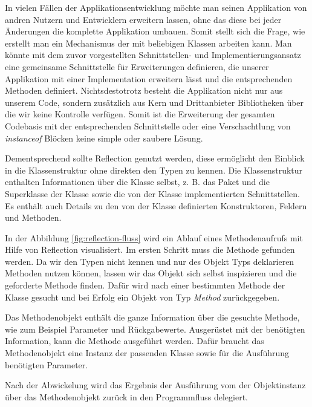   In vielen Fällen der Applikationsentwicklung möchte man seinen Applikation von andren Nutzern und Entwicklern erweitern lassen, ohne das diese bei jeder Änderungen die komplette Applikation umbauen. Somit stellt sich die Frage, wie erstellt man ein Mechanismus der mit beliebigen Klassen arbeiten kann. Man könnte mit dem zuvor vorgestellten Schnittstellen- und Implementierungsansatz eine gemeinsame Schnittstelle für Erweiterungen definieren, die unserer Applikation mit einer Implementation erweitern lässt und die entsprechenden Methoden definiert. Nichtsdestotrotz besteht die Applikation nicht nur aus unserem Code, sondern zusätzlich aus Kern und Drittanbieter Bibliotheken über die wir keine Kontrolle verfügen. Somit ist die Erweiterung der gesamten Codebasis mit der entsprechenden Schnittstelle oder eine Verschachtlung von \textit{instanceof} Blöcken keine simple oder saubere Lösung. 

  Dementsprechend sollte Reflection genutzt werden, diese ermöglicht den Einblick in die Klassenstruktur ohne direkten den Typen zu kennen. Die Klassenstruktur enthalten Informationen über die Klasse selbst, z. B. das Paket und die Superklasse der Klasse sowie die von der Klasse implementierten Schnittstellen. Es enthält auch Details zu den von der Klasse definierten Konstruktoren, Feldern und Methoden.\bigbreak

  In der Abbildung \ref{fig:reflection-fluss} wird ein Ablauf eines Methodenaufrufs mit Hilfe von Reflection visualisiert. Im ersten Schritt muss die Methode gefunden werden. Da wir den Typen nicht kennen und nur des Objekt Typs deklarieren Methoden nutzen können, lassen wir das Objekt sich selbst inspizieren und die geforderte Methode finden. Dafür wird nach einer bestimmten Methode der Klasse gesucht und bei Erfolg ein Objekt von Typ \textit{Method} zurückgegeben. 

  Das Methodenobjekt enthält die ganze Information über die gesuchte Methode, wie zum Beispiel Parameter und Rückgabewerte. Ausgerüstet mit der benötigten Information, kann die Methode ausgeführt werden. Dafür braucht das Methodenobjekt eine Instanz der passenden Klasse sowie für die Ausführung benötigten Parameter. 

  Nach der Abwickelung wird das Ergebnis der Ausführung vom der Objektinstanz über das Methodenobjekt zurück in den Programmfluss delegiert. 

